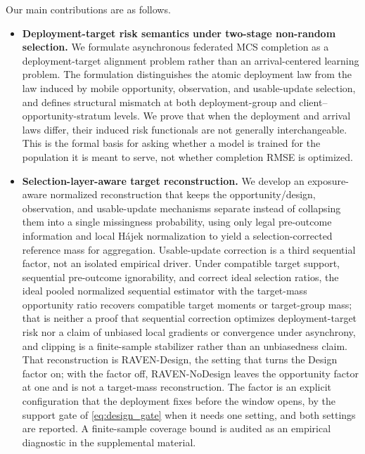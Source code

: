 \documentclass[letterpaper,journal]{IEEEtran}
\begin{document}
Our main contributions are as follows.

\begin{itemize}
    \item \textbf{Deployment-target risk semantics under two-stage non-random
    selection.}
    We formulate asynchronous federated MCS completion as a
    deployment-target alignment problem rather than an arrival-centered
    learning problem.  The formulation distinguishes the atomic deployment law
    from the law induced by mobile opportunity, observation, and usable-update
    selection, and defines structural mismatch at both deployment-group and
    client--opportunity-stratum levels.  We prove that when the deployment and
    arrival laws differ, their induced risk functionals are not generally
    interchangeable.  This is the formal basis for asking whether a model is
    trained for the population it is meant to serve, not whether completion RMSE
    is optimized.

    \item \textbf{Selection-layer-aware target reconstruction.}
    We develop an exposure-aware normalized reconstruction that keeps the
    opportunity/design, observation, and usable-update mechanisms separate
    instead of collapsing them into a single missingness probability, using only
    legal pre-outcome information and local H\'ajek normalization to yield a
    selection-corrected reference mass for aggregation.  Usable-update correction
    is a third sequential factor, not an isolated empirical driver.  Under
    compatible target support, sequential pre-outcome
    ignorability, and correct ideal selection ratios, the ideal pooled normalized
    sequential estimator with the target-mass opportunity ratio recovers
    compatible target moments or target-group mass; that is neither a proof that
    sequential correction optimizes deployment-target risk nor a claim of
    unbiased local gradients or convergence under asynchrony, and clipping is a
    finite-sample stabilizer rather than an unbiasedness claim.  That
    reconstruction is RAVEN-Design, the setting that turns the Design factor on;
    with the factor off, RAVEN-NoDesign leaves the opportunity factor at one and
    is not a target-mass reconstruction.  The factor is an explicit
    configuration that the deployment fixes before the window opens, by the
    support gate of \eqref{eq:design_gate} when it needs one setting, and both
    settings are reported.  A finite-sample coverage bound is audited as an
    empirical diagnostic in the supplemental material.


\end{itemize}
\end{document}

